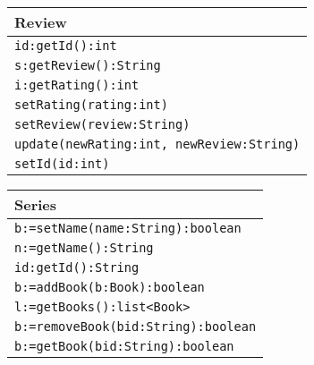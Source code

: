 \documentclass[12pt]{article}
\begin{document}
\begin{tabular}{| l |}
    \hline
    Review\\
    \hline
    \texttt{id:getId():int}\\
    \texttt{s:getReview():String}\\
    \texttt{i:getRating():int}\\
    \texttt{setRating(rating:int)}\\
    \texttt{setReview(review:String)}\\
    \texttt{update(newRating:int, newReview:String)}\\
    \texttt{setId(id:int)}\\
    \hline
\end{tabular}
\vspace{1cm}

\begin{tabular}{| l |}
    \hline
    Series\\
    \hline
    \texttt{b:=setName(name:String):boolean}\\
    \texttt{n:=getName():String}\\
    \texttt{id:getId():String}\\
    \texttt{b:=addBook(b:Book):boolean}\\
    \texttt{l:=getBooks():list<Book>}\\
    \texttt{b:=removeBook(bid:String):boolean}\\
    \texttt{b:=getBook(bid:String):boolean}\\
    \hline
    
\end{tabular}
\vspace{1cm}
\end{document}
